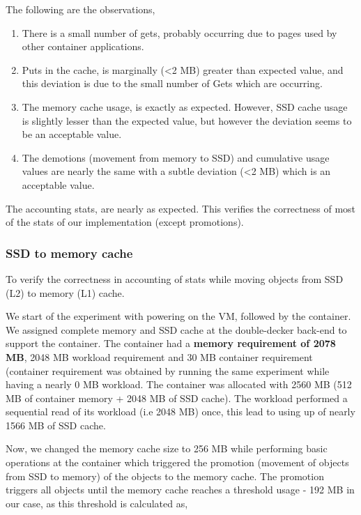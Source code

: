 	  The following are the observations,	  
	    \begin{enumerate}
	     \item There is a small number of gets, probably occurring due to pages used by other container applications.
	     \item Puts in the cache, is marginally (\textless2 MB) greater than expected value, and this deviation is due to the small number 
	     of Gets which are occurring.
	     \item The memory cache usage, is exactly as expected. However, SSD cache usage is slightly lesser than the expected value, 
	     but however the deviation seems to be an acceptable value.
	     \item The demotions (movement from memory to SSD) and cumulative usage values are nearly the same with a subtle deviation 
	     (\textless2 MB) which is an acceptable value.
	    \end{enumerate}

	  
	    The accounting stats, are nearly as expected. This verifies the correctness of most of the stats of our implementation (except promotions).
	    
	
	\subsubsection{SSD to memory cache}
	  
	    To verify the correctness in accounting of stats while moving objects from SSD (L2) to memory (L1) cache.
	    
	      We start of the experiment with powering on the VM, followed by the container. We assigned complete memory and SSD cache 
	    at the double-decker back-end to support the container. The container had a \textbf{memory requirement of 2078 MB}, 2048 MB workload
	    requirement and 30 MB container requirement (container requirement was obtained by running the same experiment while having
	    a nearly 0 MB workload. The container was allocated with 2560 MB (512 MB of container memory + 2048 MB of SSD cache).
	    The workload performed a sequential read of its workload (i.e 2048 MB) once, this lead to using up of nearly 1566 MB of SSD cache.
	    
	    Now, we changed the memory cache size to 256 MB while performing basic operations at the container which triggered the promotion 
	    (movement of objects from SSD to memory) of the objects to the memory cache. The promotion triggers all objects until the memory 
	    cache reaches a threshold usage - 192 MB in our case, as this threshold is calculated as,
	    
